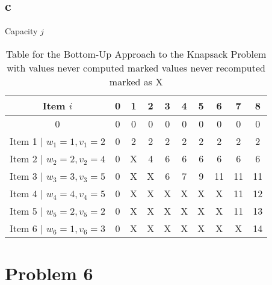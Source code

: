 \documentclass{article}
\begin{document}
\subsection*{c}
\begin{table}[ht]
    \centering
    Capacity $j$

    \begin{tabular}{c|c|c|c|c|c|c|c|c|c|}
        \hline
        \textbf{Item $i$}           & \textbf{0} & \textbf{1} & \textbf{2} & \textbf{3} & \textbf{4} & \textbf{5} & \textbf{6} & \textbf{7} & \textbf{8} \\
        \hline
        0                           & 0          & 0          & 0          & 0          & 0          & 0          & 0          & 0          & 0          \\
        \hline
        Item 1 | $w_1 = 1, v_1 = 2$ & 0          & 2          & 2          & 2          & 2          & 2          & 2          & 2          & 2          \\
        \hline
        Item 2 | $w_2 = 2, v_2 = 4$ & 0          & X          & 4          & 6          & 6          & 6          & 6          & 6          & 6          \\
        \hline
        Item 3 | $w_3 = 3, v_3 = 5$ & 0          & X          & X          & 6          & 7          & 9          & 11         & 11         & 11         \\
        \hline
        Item 4 | $w_4 = 4, v_4 = 5$ & 0          & X          & X          & X          & X          & X          & X          & 11         & 12         \\
        \hline
        Item 5 | $w_5 = 2, v_5 = 2$ & 0          & X          & X          & X          & X          & X          & X          & 11         & 13         \\
        \hline
        Item 6 | $w_6 = 1, v_6 = 3$ & 0          & X          & X          & X          & X          & X          & X          & X          & 14         \\
        \hline
    \end{tabular}
    \caption{Table for the Bottom-Up Approach to the Knapsack Problem with values never computed marked values never recomputed marked as X}
    \label{tab:table5}
\end{table}



\newpage
\section*{Problem 6}
\end{document}
